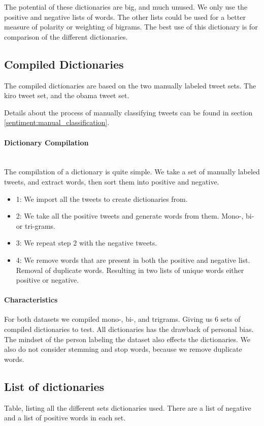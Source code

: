 The potential of these dictionaries are big, and much unused. We only use the
positive and negative lists of words. The other lists could be used for a
better measure of polarity or weighting of bigrams. The best use of this
dictionary is for comparison of the different dictionaries.  
%

\subsection{Compiled Dictionaries}
The compiled dictionaries are based on the two manually labeled tweet sets. The
kiro tweet set, and the obama tweet set.

Details about the process of manually classifying tweets can be found in section
\ref{sentiment:manual_classification}.

\paragraph{Dictionary Compilation}
\hspace{0pt}\\
The compilation of a dictionary is quite simple. We take a set of manually
labeled tweets, and extract words, then sort them into positive and negative.
\begin{itemize}
    \item 1: We import all the tweets to create dictionaries from. 
    \item 2: We take all the positive tweets and generate words from them.
Mono-, bi- or tri-grams. 
    \item 3: We repeat step 2 with the negative tweets. 
    \item 4: We remove words that are present in both the positive and negative
list. Removal of duplicate words. Resulting in two lists of unique words either
positive or negative.  
\end{itemize}

\paragraph{Characteristics}
For both datasets we compiled mono-, bi-, and trigrams. Giving us 6 sets of
compiled dictionaries to test. All dictionaries has the drawback of personal
bias. The mindset of the person labeling the dataset also effects the
dictionaries. We also do not consider stemming and stop words, because we
remove duplicate words.  
%

\subsection{List of dictionaries}
Table, listing all the different sets dictionaries used. There are a list of
negative and a list of positive words in each set. 

